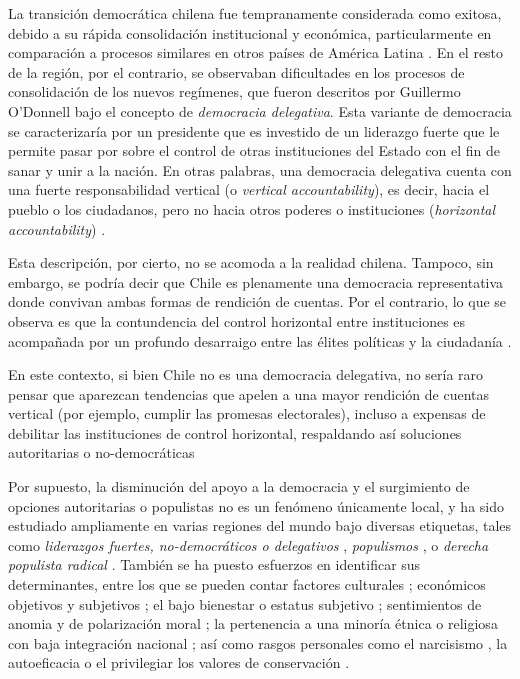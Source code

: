 \documentclass[12pt,twoside]{templates/facsothesis}
\begin{document}
La transición democrática chilena fue tempranamente considerada como exitosa, debido a su rápida consolidación institucional y económica, particularmente en comparación a procesos similares en otros países de América Latina \citep{odonnell1994}. En el resto de la región, por el contrario, se observaban dificultades en los procesos de consolidación de los nuevos regímenes, que fueron descritos por Guillermo O'Donnell \citeyearpar{odonnell1994} bajo el concepto de \emph{democracia delegativa}. Esta variante de democracia se caracterizaría por un presidente que es investido de un liderazgo fuerte que le permite pasar por sobre el control de otras instituciones del Estado con el fin de sanar y unir a la nación. En otras palabras, una democracia delegativa cuenta con una fuerte responsabilidad vertical (o \emph{vertical accountability}), es decir, hacia el pueblo o los ciudadanos, pero no hacia otros poderes o instituciones (\emph{horizontal accountability}) \citep{odonnell1994}.

Esta descripción, por cierto, no se acomoda a la realidad chilena. Tampoco, sin embargo, se podría decir que Chile es plenamente una democracia representativa donde convivan ambas formas de rendición de cuentas. Por el contrario, lo que se observa es que la contundencia del control horizontal entre instituciones es acompañada por un profundo desarraigo entre las élites políticas y la ciudadanía \citep{luna2016}.

En este contexto, si bien Chile no es una democracia delegativa, no sería raro pensar que aparezcan tendencias que apelen a una mayor rendición de cuentas vertical (por ejemplo, cumplir las promesas electorales), incluso a expensas de debilitar las instituciones de control horizontal, respaldando así soluciones autoritarias o no-democráticas \citep{carlin2018}

Por supuesto, la disminución del apoyo a la democracia y el surgimiento de opciones autoritarias o populistas no es un fenómeno únicamente local, y ha sido estudiado ampliamente en varias regiones del mundo bajo diversas etiquetas, tales como \emph{liderazgos fuertes, no-democráticos o delegativos} \citep{carlin2011, carlin2018, crimston2022, kang2018, lima2021, selvanathan2022, xuereb2021}, \emph{populismos} \citep{baro2022, gidron2020, nowakowski2021}, o \emph{derecha populista radical} \citep{diaz2023, donovan2019, donovan2021}. También se ha puesto esfuerzos en identificar sus determinantes, entre los que se pueden contar factores culturales \citep{lima2021, marchlewska2022, selvanathan2022}; económicos objetivos y subjetivos \citep{arikan2019, rico2020, wu2019, xuereb2021}; el bajo bienestar o estatus subjetivo \citep{gidron2020, nowakowski2021}; sentimientos de anomia y de polarización moral \citep{crimston2022}; la pertenencia a una minoría étnica o religiosa con baja integración nacional \citep{eskelinen2020}; así como rasgos personales como el narcisismo \citep{marchlewska2019}, la autoeficacia \citep{rico2020} o el privilegiar los valores de conservación \citep{baro2022}.
\end{document}
